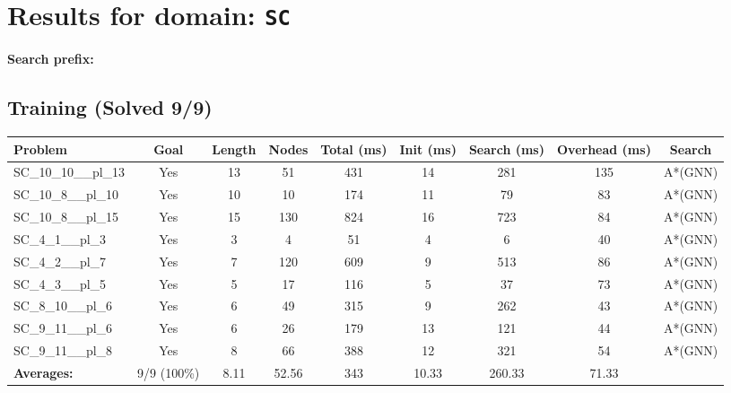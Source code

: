 \documentclass{article}
\begin{document}
\section*{Results for domain: \texttt{SC}}
\textbf{Search prefix:} 
\\[0.5cm]
\subsection*{Training (Solved 9/9)}
\begin{tabular}{lcccccccc}
\toprule
Problem & Goal & Length & Nodes & Total (ms) & Init (ms) & Search (ms) & Overhead (ms) & Search \\
\midrule
SC\_10\_10\_\_pl\_13 & Yes & 13 & 51 & 431 & 14 & 281 & 135 & A*(GNN) \\
SC\_10\_8\_\_pl\_10 & Yes & 10 & 10 & 174 & 11 & 79 & 83 & A*(GNN) \\
SC\_10\_8\_\_pl\_15 & Yes & 15 & 130 & 824 & 16 & 723 & 84 & A*(GNN) \\
SC\_4\_1\_\_pl\_3 & Yes & 3 & 4 & 51 & 4 & 6 & 40 & A*(GNN) \\
SC\_4\_2\_\_pl\_7 & Yes & 7 & 120 & 609 & 9 & 513 & 86 & A*(GNN) \\
SC\_4\_3\_\_pl\_5 & Yes & 5 & 17 & 116 & 5 & 37 & 73 & A*(GNN) \\
SC\_8\_10\_\_pl\_6 & Yes & 6 & 49 & 315 & 9 & 262 & 43 & A*(GNN) \\
SC\_9\_11\_\_pl\_6 & Yes & 6 & 26 & 179 & 13 & 121 & 44 & A*(GNN) \\
SC\_9\_11\_\_pl\_8 & Yes & 8 & 66 & 388 & 12 & 321 & 54 & A*(GNN) \\
\textbf{Averages:} & 9/9 (100\%) & 8.11 & 52.56 & 343 & 10.33 & 260.33 & 71.33 & \\
\bottomrule
\end{tabular}
\\[0.7cm]
\end{document}
